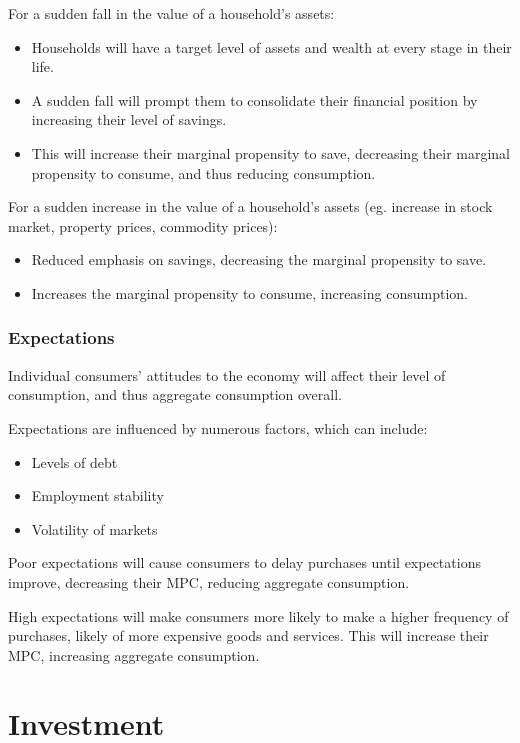 \documentclass[a4paper,11pt]{article}
\begin{document}
For a sudden fall in the value of a household's assets:

\begin{itemize}
\item Households will have a target level of assets and wealth at every stage
	in their life.
\item A sudden fall will prompt them to consolidate their financial position by
	increasing their level of savings.
\item This will increase their marginal propensity to save, decreasing their
	marginal propensity to consume, and thus reducing consumption.
\end{itemize}

For a sudden increase in the value of a household's assets (eg. increase in
stock market, property prices, commodity prices):

\begin{itemize}
\item Reduced emphasis on savings, decreasing the marginal propensity to save.
\item Increases the marginal propensity to consume, increasing consumption.
\end{itemize}


\subsubsection{Expectations}

Individual consumers' attitudes to the economy will affect their level of
consumption, and thus aggregate consumption overall.

Expectations are influenced by numerous factors, which can include:

\begin{itemize}
\item Levels of debt
\item Employment stability
\item Volatility of markets
\end{itemize}

Poor expectations will cause consumers to delay purchases until expectations
improve, decreasing their MPC, reducing aggregate consumption.

High expectations will make consumers more likely to make a higher frequency of
purchases, likely of more expensive goods and services. This will increase their
MPC, increasing aggregate consumption.




\section{Investment}
\end{document}
